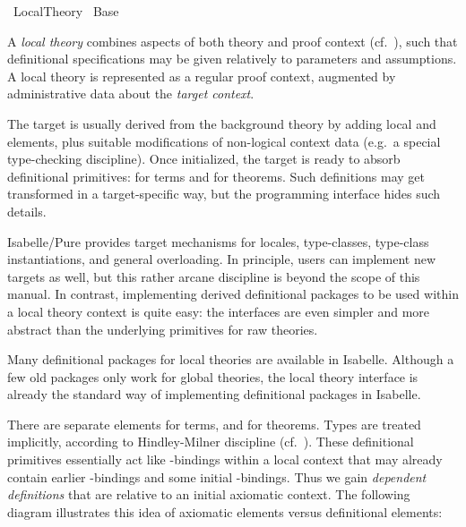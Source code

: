 %
\begin{isabellebody}%
\def\isabellecontext{Local{\isacharunderscore}Theory}%
%
\isadelimtheory
%
\endisadelimtheory
%
\isatagtheory
{}\isamarkupfalse%
\ Local{\isacharunderscore}Theory\isanewline
{}\ Base\isanewline
{}%
\endisatagtheory
{\isafoldtheory}%
%
\isadelimtheory
%
\endisadelimtheory
%
\isamarkuptrue%
%
\begin{isamarkuptext}%
A \emph{local theory} combines aspects of both theory and proof
  context (cf.\ ), such that definitional
  specifications may be given relatively to parameters and
  assumptions.  A local theory is represented as a regular proof
  context, augmented by administrative data about the \emph{target
  context}.

  The target is usually derived from the background theory by adding
  local \isa{{\isasymFIX}} and \isa{{\isasymASSUME}} elements, plus
  suitable modifications of non-logical context data (e.g.\ a special
  type-checking discipline).  Once initialized, the target is ready to
  absorb definitional primitives: \isa{{\isasymDEFINE}} for terms and
  \isa{{\isasymNOTE}} for theorems.  Such definitions may get
  transformed in a target-specific way, but the programming interface
  hides such details.

  Isabelle/Pure provides target mechanisms for locales, type-classes,
  type-class instantiations, and general overloading.  In principle,
  users can implement new targets as well, but this rather arcane
  discipline is beyond the scope of this manual.  In contrast,
  implementing derived definitional packages to be used within a local
  theory context is quite easy: the interfaces are even simpler and
  more abstract than the underlying primitives for raw theories.

  Many definitional packages for local theories are available in
  Isabelle.  Although a few old packages only work for global
  theories, the local theory interface is already the standard way of
  implementing definitional packages in Isabelle.%
\end{isamarkuptext}%
\isamarkuptrue%
%
\isamarkuptrue%
%
\begin{isamarkuptext}%
There are separate elements  for terms, and
   for theorems.  Types are treated
  implicitly, according to Hindley-Milner discipline (cf.\
  ).  These definitional primitives essentially
  act like -bindings within a local context that may
  already contain earlier \isa{let}-bindings and some initial
  \isa{{\isasymlambda}}-bindings.  Thus we gain \emph{dependent definitions}
  that are relative to an initial axiomatic context.  The following
  diagram illustrates this idea of axiomatic elements versus
  definitional elements:


\end{isamarkuptext}
\end{isabellebody}
